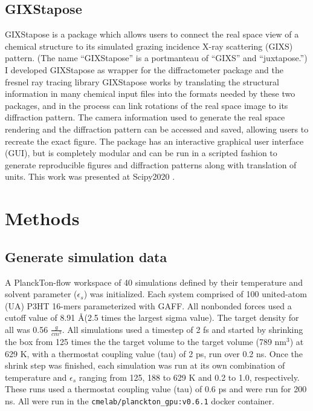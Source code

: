\subsection{GIXStapose}
GIXStapose is a package which allows users to connect the real space view of a chemical structure to its simulated grazing incidence X-ray scattering (GIXS) pattern. (The name ``GIXStapose'' is a portmanteau of ``GIXS'' and ``juxtapose.'') 
I developed GIXStapose as wrapper for the diffractometer package and the fresnel ray tracing library \cite{Diffract, Jones2017, fresnel}
GIXStapose works by translating the structural information in many chemical input files into the formats needed by these two packages, and in the process can link rotations of the real space image to its diffraction pattern. 
The camera information used to generate the real space rendering and the diffraction pattern can be accessed and saved, allowing users to recreate the exact figure.
The package has an interactive graphical user interface (GUI), but is completely modular and can be run in a scripted fashion to generate reproducible figures and diffraction patterns along with translation of units. 
This work was presented at Scipy2020 \cite{gixstapose-scipy}. 

\section{Methods}
\subsection{Generate simulation data}
A PlanckTon-flow workspace of 40 simulations defined by their temperature and solvent parameter ($\epsilon_{s}$) was initialized. Each system comprised of 100 united-atom (UA) P3HT 16-mers parameterized with GAFF. %
All nonbonded forces used a cutoff value of 8.91 \AA (2.5 times the largest sigma value). The target density for all was 0.56 $\frac{g}{cm^{3}}$. All simulations used a timestep of 2 fs and started by shrinking the box from 125 times the the target volume to the target volume (789 nm$^3$) at 629 K, with a thermostat coupling value (tau) of 2 ps, run over 0.2 ns. Once the shrink step was finished, each simulation was run at its own combination of temperature and $\epsilon_{s}$ ranging from 125, 188 to 629 K and 0.2 to 1.0, respectively. These runs used a thermostat coupling value (tau) of 0.6 ps and were run for 200 ns. All were run in the \lstinline{cmelab/planckton_gpu:v0.6.1} docker container.

